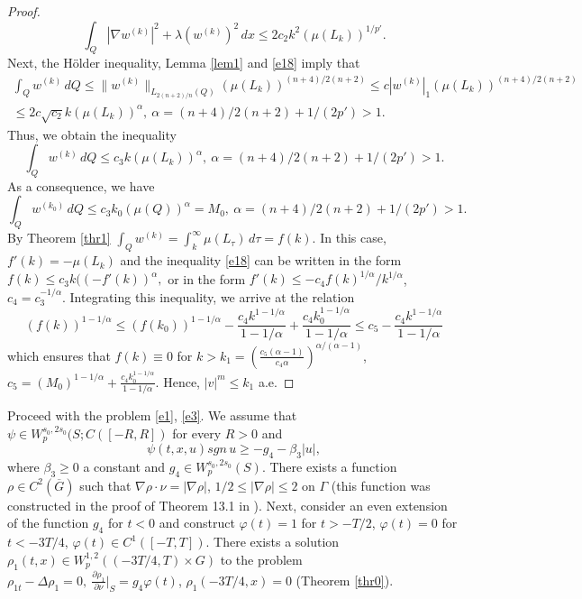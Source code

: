 \documentclass{article}
\theoremstyle{plain}
\begin{document}
\begin{proof}
\begin{equation}
\int_{Q} |\nabla w^{(k)}|^2+ \lambda  (w^{(k)})^2\,dx \leq  2c_2k^2 (\mu(L_k))^{1/p'}.
\end{equation}
Next, the H\"{o}lder inequality, Lemma \ref{lem1} and \eqref{e18} imply that 
\begin{multline*}
\int_Q w^{(k)}\,dQ \leq \|w^{(k)}\|_{L_{2(n+2)/n}(Q)}(\mu(L_k))^{(n+4)/2(n+2)}\leq c |w^{(k)}|_1 (\mu(L_k))^{(n+4)/2(n+2)}\\ \leq 
2c\sqrt{c_2}k(\mu(L_k))^{\alpha}, \  \alpha=(n+4)/2(n+2)+ 1/(2p')>1.
\end{multline*}
Thus, we obtain the inequality 
 \begin{equation}\label{e19}
\int_Q w^{(k)}\,dQ \leq c_3 k(\mu(L_k))^{\alpha}, \  \alpha=(n+4)/2(n+2)+ 1/(2p')>1.
\end{equation}
As a consequence, we  have
 \begin{equation}\label{e195}
\int_Q w^{(k_0)}\,dQ \leq c_3 k_0 (\mu(Q))^{\alpha}=M_0, \  \alpha=(n+4)/2(n+2)+ 1/(2p')>1.
\end{equation}
By Theorem  \ref{thr1} $\int_Q w^{(k)}=\int_k^\infty \mu(L_\tau)\,d\tau=f(k)$. In this case,  $f'(k)=-\mu(L_k)$ and the inequality  \eqref{e18} can be written in the form 
 $
f(k) \leq c_3 k((-f'(k))^{\alpha},
$
 or in the form  $f'(k)\leq - c_4 f(k)^{1/\alpha}/k^{1/\alpha}$, $c_4=c_3^{-1/\alpha}$. 
Integrating this inequality, we arrive at the relation  
$$
(f(k))^{1-1/\alpha}\leq (f(k_0))^{1-1/\alpha} - \frac{c_4 k^{1-1/\alpha}}{1-1/\alpha} +  \frac{c_4 k_0^{1-1/\alpha}}{1-1/\alpha}\leq c_5-  \frac{c_4 k^{1-1/\alpha}}{1-1/\alpha}
$$
which ensures that  $f(k)\equiv 0 $ for  $k>k_1=(\frac{c_5 (\alpha-1)}{c_4\alpha})^{\alpha/(\alpha-1)}$,  $c_5=(M_0)^{1-1/\alpha}+\frac{c_4 k_0^{1-1/\alpha}}{1-1/\alpha}$.  
Hence,  $|v|^m\leq k_1$ a.e.  
\end{proof}

Proceed with the problem  \eqref{e1},  \eqref{e3}. 
We assume that  $\psi\in W_p^{s_0,2s_0}(S;C([-R,R])$ for every  $R>0$ and
\begin{equation}\label{e201}
\psi(t,x,u)sgn\,u\geq -g_4-\beta_3 |u|, 
\end{equation}
where   $\beta_3\geq 0$  a constant and $g_4\in W_p^{s_0,2s_0}(S)$.  There exists a function $\rho\in C^2(\overline{G})$ such that 
 $\nabla \rho\cdot \nu=|\nabla \rho|$, $1/2\leq |\nabla \rho|\leq 2$ on $\Gamma$
(this function was constructed in the proof of Theorem  13.1 in \cite{lie}). 
Next, consider an even extension of the function $g_4$ for $t<0$ and construct $\varphi(t)=1$ for $t>-T/2$,  $\varphi(t)=0$ for $t<-3T/4$, $\varphi(t)\in C^1([-T,T])$. 
There exists a solution   $\rho_1(t,x)\in W_p^{1,2}((-3T/4,T)\times G)$ to the problem 
$\rho_{1t}-\Delta \rho_1=0,\ \frac{\partial \rho_1}{\partial \nu}|_S=g_4\varphi(t)$, $\rho_{1}(-3T/4,x)=0$ (Theorem \ref{thr0}). 
  
\end{document}
